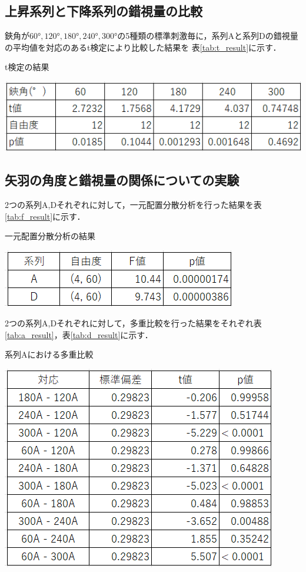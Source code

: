\documentclass{jlreq}
\numberwithin{equation}{section}
\begin{document}
\subsection{上昇系列と下降系列の錯視量の比較}
鋏角が$60\si{\degree}, 120\si{\degree}, 180\si{\degree}, 240\si{\degree}, 300\si{\degree}$の5種類の標準刺激毎に，系列Aと系列Dの錯視量の平均値を対応のあるt検定により比較した結果を
表\ref{tab:t_result}に示す．

\begin{table}[H]
  \centering
  \caption{t検定の結果}
  \includegraphics{image/t_result.png}
  \label{tab:t_result}
\end{table}

\subsection{矢羽の角度と錯視量の関係についての実験}
2つの系列A,Dそれぞれに対して，一元配置分散分析を行った結果を表\ref{tab:f_result}に示す．

\begin{table}[H]
  \centering
  \caption{一元配置分散分析の結果}
  \includegraphics{image/f_result.png}
  \label{tab:f_result}
\end{table}

2つの系列A,Dそれぞれに対して，多重比較を行った結果をそれぞれ表\ref{tab:a_result}，表\ref{tab:d_result}に示す．

\begin{table}[H]
  \centering
  \caption{系列Aにおける多重比較}
  \includegraphics{image/a_result.png}
  \label{tab:a_result}
\end{table}
\end{document}
